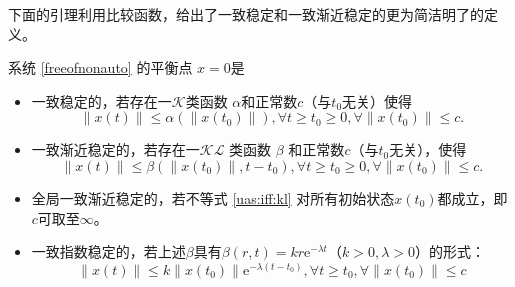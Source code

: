 \newpage
下面的引理利用比较函数，给出了一致稳定和一致渐近稳定的更为简洁明了的定义。
\begin{lemma}\label{comp_uniform}
  系统 \eqref{freeofnonauto} 的平衡点 $x = 0$是
  \begin{itemize}[leftmargin=1em]
  \item 一致稳定的，若存在一$\mathcal{K}$类函数 $\alpha$和正常数$c$（与$t_0$无关）使得
   \[ \| x (t) \| \leq \alpha (\| x (t_0) \|), \forall t \geq t_0 \geq 0,
       \forall \| x (t_0) \| \le c. \]
  \item 一致渐近稳定的，若存在一$\mathcal{K}\mathcal{L}$ 类函数 $\beta$ 和正常数$c$（与$t_0$无关），使得
  \begin{equation}
    \| x (t) \| \leq \beta (\| x (t_0) \|, t - t_0), \forall t \geq t_0 \geq
    0, \forall \| x (t_0) \| \le  c \label{uas:iff:kl} .
  \end{equation}
  \item 全局一致渐近稳定的，若不等式 \eqref{uas:iff:kl} 对所有初始状态$x (t_0)$都成立，即$c$可取至$\infty$。
  \item 一致指数稳定的，若上述$\beta$具有$\beta(r,t)=kr\mathrm{e}^{-\lambda t}$（$k>0,\lambda>0$）的形式：
  \[\|x(t)\|\le k\|x(t_0)\|\mathrm{e}^{-\lambda(t-t_0)}, \forall t \geq t_0,\forall \| x (t_0) \| \le  c \]
  \end{itemize}
\end{lemma}
